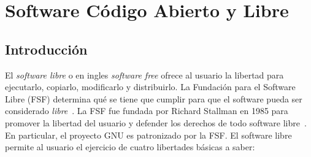 \chapter{Software Código Abierto y Libre}
\section{Introducción}

El \textit{software libre} o en ingles \textit{software free} ofrece
al usuario la libertad para ejecutarlo, copiarlo, modificarlo y
distribuirlo. La Fundación para el Software Libre (FSF) determina qué
se tiene que cumplir para que el software pueda ser considerado
\textit{libre}~\cite{Etiqueta07}. La FSF fue fundada por Richard
Stallman en 1985 para promover la libertad del usuario y defender los
derechos de todo software libre~\cite{Etiqueta14}. En particular, el
proyecto GNU es patronizado por la FSF. El software libre permite al
usuario el ejercicio de cuatro libertades básicas a saber:

